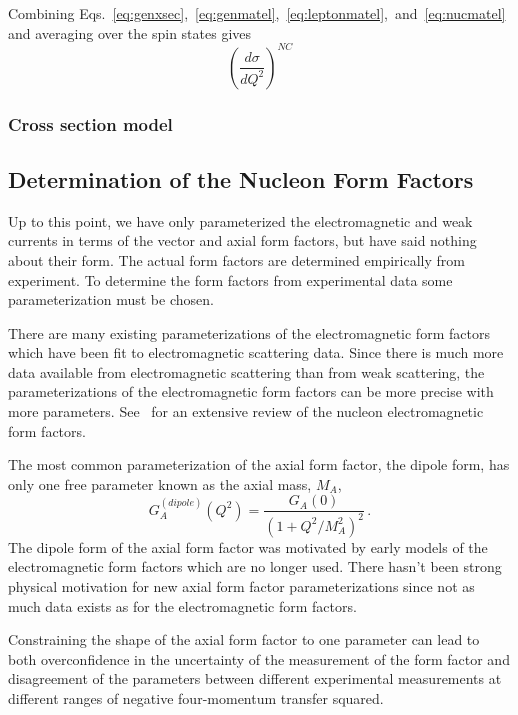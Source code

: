   Combining
  Eqs.~\ref{eq:genxsec},~\ref{eq:genmatel},~\ref{eq:leptonmatel},~and~\ref{eq:nucmatel}
  and averaging over the spin states gives
  \begin{equation}
    (\frac{d\sigma}{dQ^2})^{NC}
  \end{equation}
  

  \subsubsection{Cross section model}


\subsection{Determination of the Nucleon Form Factors} \label{sec:formfactorforms}

  Up to this point, we have only parameterized the electromagnetic and weak
  currents in terms of the vector and axial form factors, but have said nothing
  about their form. The actual form factors are determined empirically from
  experiment. To determine the form factors from experimental data some
  parameterization must be chosen.

  There are many existing parameterizations of the electromagnetic form factors
  which have been fit to electromagnetic scattering data. Since there is much
  more data available from electromagnetic scattering than from weak
  scattering, the parameterizations of the electromagnetic form factors can be
  more precise with more parameters.
  See~\cite{Perdrisat:2006hj} for an extensive review of
  the nucleon electromagnetic form factors.
  
  The most common parameterization of the axial form factor, the dipole form,
  has only one free parameter known as the axial mass, $M_A$,
  \begin{equation}
    G_A^{(dipole)}(Q^2) = \frac{G_A(0)}{(1+Q^2/M_A^2)^2} \,.
  \end{equation}
  The dipole form of the axial form factor was motivated by early models of the
  electromagnetic form factors which are no longer used. There hasn't been
  strong physical motivation for new axial form factor parameterizations since
  not as much data exists as for the electromagnetic form factors.

  Constraining the shape of the axial form factor to one parameter can lead to
  both overconfidence in the uncertainty of the measurement of the form factor
  and disagreement of the parameters between different experimental
  measurements at different ranges of negative four-momentum transfer squared.


